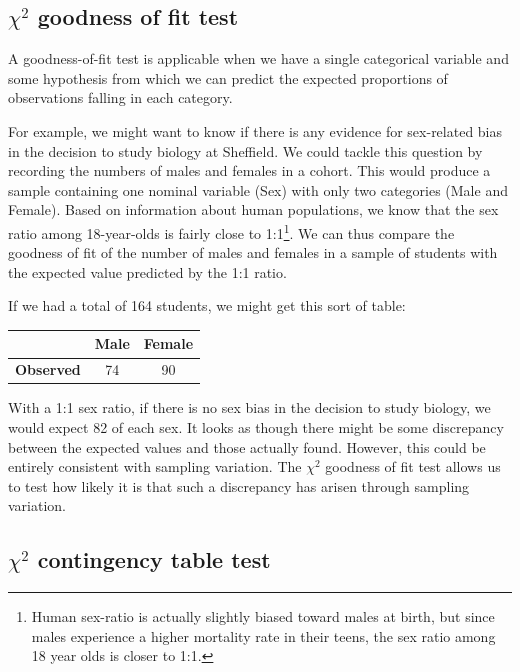 \documentclass[
]{book}
\begin{document}
\hypertarget{chi2-goodness-of-fit-test}{%
\subsection{\texorpdfstring{\(\chi^{2}\) goodness of fit test}{\textbackslash chi\^{}\{2\} goodness of fit test}}\label{chi2-goodness-of-fit-test}}

A goodness-of-fit test is applicable when we have a single categorical variable and some hypothesis from which we can predict the expected proportions of observations falling in each category.

For example, we might want to know if there is any evidence for sex-related bias in the decision to study biology at Sheffield. We could tackle this question by recording the numbers of males and females in a cohort. This would produce a sample containing one nominal variable (Sex) with only two categories (Male and Female). Based on information about human populations, we know that the sex ratio among 18-year-olds is fairly close to 1:1\footnote{Human sex-ratio is actually slightly biased toward males at birth, but since males experience a higher mortality rate in their teens, the sex ratio among 18 year olds is closer to 1:1.}. We can thus compare the goodness of fit of the number of males and females in a sample of students with the expected value predicted by the 1:1 ratio.

If we had a total of 164 students, we might get this sort of table:

\begin{longtable}[]{@{}lcc@{}}
\toprule()
& Male & Female \\
\midrule()
\endhead
\textbf{Observed} & 74 & 90 \\
\bottomrule()
\end{longtable}

With a 1:1 sex ratio, if there is no sex bias in the decision to study biology, we would expect 82 of each sex. It looks as though there might be some discrepancy between the expected values and those actually found. However, this could be entirely consistent with sampling variation. The \(\chi^{2}\) goodness of fit test allows us to test how likely it is that such a discrepancy has arisen through sampling variation.

\hypertarget{chi2-contingency-table-test}{%
\subsection{\texorpdfstring{\(\chi^{2}\) contingency table test}{\textbackslash chi\^{}\{2\} contingency table test}}\label{chi2-contingency-table-test}}
\end{document}
